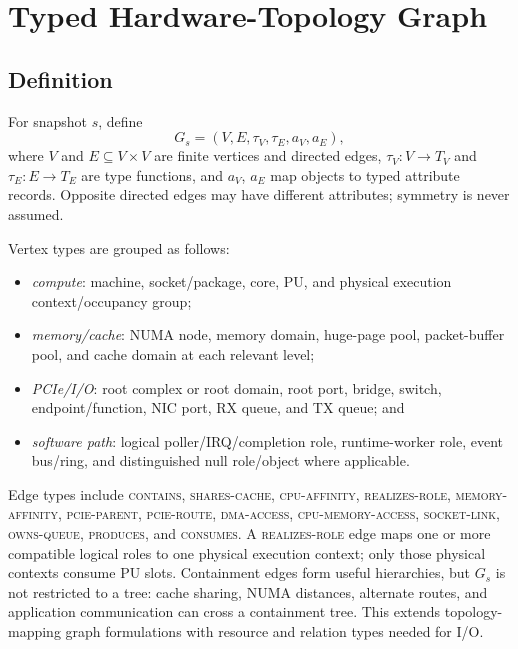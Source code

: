 \section{Typed Hardware-Topology Graph}
\label{sec:graph}

\subsection{Definition}

For snapshot $s$, define
\begin{equation}
  G_s=(V,E,\tau_V,\tau_E,a_V,a_E),
  \label{eq:typed-graph}
\end{equation}
where $V$ and $E\subseteq V\times V$ are finite vertices and directed edges, $\tau_V:V\rightarrow T_V$ and $\tau_E:E\rightarrow T_E$ are type functions, and $a_V$, $a_E$ map objects to typed attribute records. Opposite directed edges may have different attributes; symmetry is never assumed.

Vertex types are grouped as follows:

\begin{itemize}[leftmargin=*,itemsep=2pt]
  \item \emph{compute}: machine, socket/package, core, PU, and physical execution context/occupancy group;
  \item \emph{memory/cache}: NUMA node, memory domain, huge-page pool, packet-buffer pool, and cache domain at each relevant level;
  \item \emph{PCIe/I/O}: root complex or root domain, root port, bridge, switch, endpoint/function, NIC port, RX queue, and TX queue; and
  \item \emph{software path}: logical poller/IRQ/completion role, runtime-worker role, event bus/ring, and distinguished null role/object where applicable.
\end{itemize}

Edge types include \textsc{contains}, \textsc{shares-cache}, \textsc{cpu-affinity}, \textsc{realizes-role}, \textsc{memory-affinity}, \textsc{pcie-parent}, \textsc{pcie-route}, \textsc{dma-access}, \textsc{cpu-memory-access}, \textsc{socket-link}, \textsc{owns-queue}, \textsc{produces}, and \textsc{consumes}. A \textsc{realizes-role} edge maps one or more compatible logical roles to one physical execution context; only those physical contexts consume PU slots. Containment edges form useful hierarchies, but $G_s$ is not restricted to a tree: cache sharing, NUMA distances, alternate routes, and application communication can cross a containment tree. This extends topology-mapping graph formulations \cite{hoefler2011topologymapping} with resource and relation types needed for I/O.

